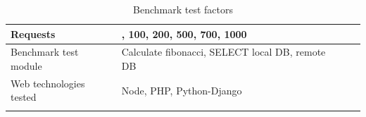 \documentclass[../thesis.tex]{subfiles}
\begin{document}
\begin{table}[H]
	\caption{Benchmark test factors}
	\centering
	\footnotesize
	\label{tab1}
	\begin{tabular}{!{\color{sapphire}\vrule width 1pt}m{0.22\textwidth}!{\color{black}\vrule width 1pt}m{0.22\textwidth}!{\color{black}\vrule width 1pt}m{0.22\textwidth}!{\color{black}\vrule width 1pt}m{0.22\textwidth}!{\color{sapphire}\vrule width 1pt}}
		\hline
		\Centering Requests &
		, 100, 200, 500, 700, 1000 \\
		\hline
		\Centering Benchmark test module & 
		\Centering Calculate fibonacci, SELECT local DB, remote DB \\
		\hline
		\Centering Web technologies tested & 
		\Centering Node, PHP, Python-Django \\
		\hline
		\hline
	\end{tabular}
\end{table} 
\lipsum[1-1]
\end{document}
